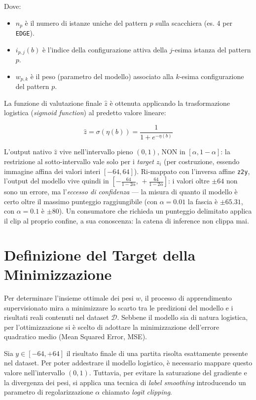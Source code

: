 Dove:
\begin{itemize}
    \item $n_p$ è il numero di istanze uniche del pattern $p$ sulla scacchiera (es. 4 per \texttt{EDGE}).
    \item $i_{p,j}(b)$ è l'indice della configurazione attiva della $j$-esima istanza del pattern $p$.
    \item $w_{p, k}$ è il peso (parametro del modello) associato alla $k$-esima configurazione del pattern $p$.
\end{itemize}

La funzione di valutazione finale $\hat{z}$ è ottenuta applicando la trasformazione logistica (\textit{sigmoid function}) al predetto valore lineare:

\begin{equation}
  \hat{z} = \sigma(\eta(b)) = \frac{1}{1 + e^{-\eta(b)}}
\end{equation}

L'output nativo $\hat{z}$ vive nell'intervallo pieno $(0, 1)$, NON in $[\alpha, 1-\alpha]$:
la restrizione al sotto-intervallo vale solo per i \emph{target} $z_i$ (per costruzione,
essendo immagine affina dei valori interi $[-64, 64]$). Ri-mappato con l'inversa affine
\texttt{z2y}, l'output del modello vive quindi in
$[-\frac{64}{1-2\alpha},\, +\frac{64}{1-2\alpha}]$: i valori oltre $\pm 64$ non sono un
errore, ma l'\emph{eccesso di confidenza} — la misura di quanto il modello è certo oltre il
massimo punteggio raggiungibile (con $\alpha = 0.01$ la fascia è $\pm 65.31$, con
$\alpha = 0.1$ è $\pm 80$). Un consumatore che richieda un punteggio delimitato applica
il clip al proprio confine, a sua conoscenza: la catena di inference non clippa mai.

\section{Definizione del Target della Minimizzazione}

Per determinare l'insieme ottimale dei pesi $w$, il processo di apprendimento supervisionato mira a minimizzare lo scarto tra le predizioni del modello e i risultati reali contenuti nel dataset $\mathcal{D}$.
Sebbene il modello sia di natura logistica, per l'ottimizzazione si è scelto di adottare la minimizzazione dell'errore quadratico medio (Mean Squared Error, MSE).

Sia $y \in [-64, +64]$ il risultato finale di una partita risolta esattamente presente nel dataset. Per poter addestrare il modello logistico, è necessario mappare questo valore nell'intervallo $(0, 1)$.
Tuttavia, per evitare la saturazione del gradiente e la divergenza dei pesi, si applica una tecnica di \textit{label smoothing} introducendo
un parametro di regolarizzazione $\alpha$ chiamato \textit{logit clipping}.

